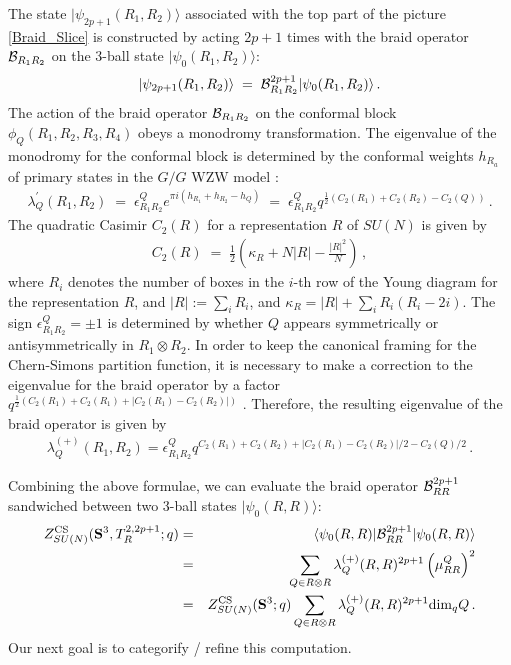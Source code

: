 \documentclass[hyper,letterpaper]{JHEP3}
\renewcommand{\S}{{\bf S}}
\begin{document}
The state $|\psi_{2p+1}(R_1,R_2)\rangle$ associated with the top part of the picture \ref{Braid_Slice}
is constructed by acting $2p+1$ times with the braid operator ${\cal B}_{R_1R_2}$ on the 3-ball state $|\psi_{0} (R_1,R_2)\rangle$:
\begin{eqnarray}
|\psi_{2p+1}(R_1,R_2)\rangle \; = \; {\cal B}_{R_1R_2}^{2p+1}|\psi_{0}(R_1,R_2) \rangle \,.
\end{eqnarray}
The action of the braid operator ${\cal B}_{R_1R_2}$ on the conformal block
$\phi_Q(R_1,R_2,R_3,R_4)$ obeys a monodromy transformation.
The eigenvalue of the monodromy for the conformal block is determined by the
conformal weights $h_{R_a}$ of primary states in the $G/G$ WZW model \cite{Moore_Seiberg}:
\begin{eqnarray}
\lambda_Q^{\prime}(R_1,R_2) \; = \;
\epsilon_{R_1R_2}^Qe^{\pi i(h_{R_1}+h_{R_2}-h_Q)}
\; = \; \epsilon_{R_1R_2}^Qq^{\frac{1}{2}(C_2(R_1)+C_2(R_2)-C_2(Q))} \,.
\end{eqnarray}
The quadratic Casimir $C_2(R)$ for a representation $R$ of $SU(N)$ is given by
\begin{eqnarray}
C_2(R) \;= \; \frac{1}{2}\left(\kappa_R+N |R|-\frac{|R|^2}{N}\right) \,,
\end{eqnarray}
where $R_i$ denotes the number of boxes in the $i$-th row of the Young diagram for the representation $R$,
and $|R|:=\sum_i R_i$, and $\kappa_R=|R|+\sum_iR_i(R_i-2i)$.
The sign $\epsilon_{R_1R_2}^Q=\pm 1$ is determined by whether $Q$
appears symmetrically or antisymmetrically in $R_1\otimes R_2$.
In order to keep the canonical framing for the Chern-Simons partition function,
it is necessary to make a correction to the eigenvalue for the braid
operator by a factor
$q^{\frac{1}{2}(C_2(R_1)+C_2(R_1)+|C_2(R_1)-C_2(R_2)|)}$
\cite{RGK,Witten_Jones}. Therefore, the resulting eigenvalue of the braid operator is given by
\begin{eqnarray}
\lambda_Q^{(+)}(R_1,R_2)=\epsilon_{R_1R_2}^Qq^{C_2(R_1)+C_2(R_2)+|C_2(R_1)-C_2(R_2)|/2-C_2(Q)/2} \,.
\label{unrefeigl}
\end{eqnarray}

Combining the above formulae, we can evaluate the braid operator ${\cal B}_{RR}^{2p+1}$
sandwiched between two 3-ball states $|\psi_0(R,R)\rangle$:
\begin{eqnarray}
Z_{SU(N)}^{\rm CS}(\S^3,T^{2,2p+1}_R;q)
& =& \langle \psi_0(R,R)|{\cal B}_{RR}^{2p+1}|\psi_0(R,R)\rangle
\label{ZT22p1braid} \\
& = & \sum_{Q\in R\otimes R}\lambda^{(+)}_Q(R,R)^{2p+1}\left(\mu^Q_{RR}\right)^2
\nonumber \\
& = & Z_{SU(N)}^{\rm CS}(\S^3;q)\sum_{Q \in R \otimes R}\lambda^{(+)}_Q(R,R)^{2p+1}{\rm dim}_qQ \,.
\nonumber
\end{eqnarray}
Our next goal is to categorify / refine this computation.
\end{document}
